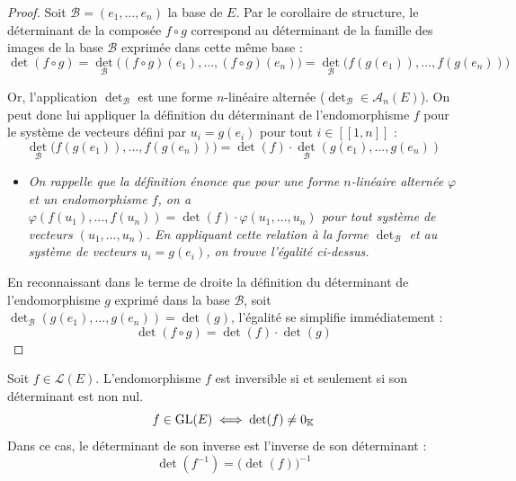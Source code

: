 \documentclass[12pt, a4paper]{report}
\begin{document}
\begin{proof}
    Soit $\mathcal{B} = (e_1, \dots, e_n)$ la base de $E$. Par le corollaire de structure, le déterminant de la composée $f \circ g$ correspond au déterminant de la famille des images de la base $\mathcal{B}$ exprimée dans cette même base :
    $$\det(f \circ g) = \det_{\mathcal{B}}\bigl((f \circ g)(e_1), \dots, (f \circ g)(e_n)\bigr) = \det_{\mathcal{B}}\bigl(f(g(e_1)), \dots, f(g(e_n))\bigr)$$
    
    Or, l'application $\det_{\mathcal{B}}$ est une forme $n$-linéaire alternée ($\det_{\mathcal{B}} \in \mathscr{A}_n(E)$). On peut donc lui appliquer la définition du déterminant de l'endomorphisme $f$ pour le système de vecteurs défini par $u_i = g(e_i)$ pour tout $i \in [\![1,n]\!]$ :
    $$\det_{\mathcal{B}}\bigl(f(g(e_1)), \dots, f(g(e_n))\bigr) = \det(f) \cdot \det_{\mathcal{B}}(g(e_1), \dots, g(e_n))$$

    \begin{itemize}
        \item \textit{On rappelle que la définition énonce que pour une forme $n$-linéaire alternée $\varphi$ et un endomorphisme $f$, on a $\varphi(f(u_1), \dots, f(u_n)) = \det(f) \cdot \varphi(u_1, \dots, u_n)$ pour tout système de vecteurs $(u_1, \dots, u_n)$. En appliquant cette relation à la forme $\det_{\mathcal{B}}$ et au système de vecteurs $u_i = g(e_i)$, on trouve l'égalité ci-dessus.}
    \end{itemize}
    
    En reconnaissant dans le terme de droite la définition du déterminant de l'endomorphisme $g$ exprimé dans la base $\mathcal{B}$, soit $\det_{\mathcal{B}}(g(e_1), \dots, g(e_n)) = \det(g)$, l'égalité se simplifie immédiatement :
    $$\det(f \circ g) = \det(f) \cdot \det(g)$$
\end{proof}

\begin{property}
    Soit $f \in \mathcal{L}(E)$. L'endomorphisme $f$ est inversible si et seulement si son déterminant est non nul.
    $$f \in \mathrm{GL}(E) \iff \det(f) \ne 0_{\mathbb{K}}$$
    Dans ce cas, le déterminant de son inverse est l'inverse de son déterminant :
    $$\det(f^{-1}) = \bigl(\det(f)\bigr)^{-1}$$
\end{property}
\end{document}
